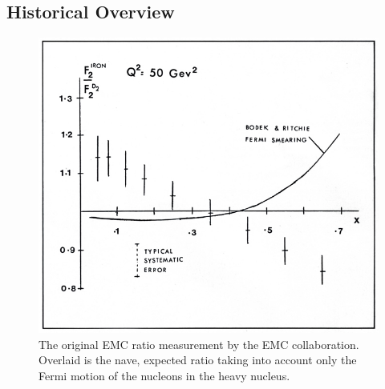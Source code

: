 \subsection{Historical Overview} \label{ssec:emc-history}

\begin{figure}
	\centering
	\includegraphics[height=0.35\textheight]{figures/background/emc_effect_original-v2.jpg}
	\caption{The original EMC ratio measurement by the EMC collaboration\cite{Aubert:1983xm}. Overlaid is the nave, expected ratio taking into account only the Fermi motion of the nucleons in the heavy nucleus.}
	\label{fig:emc-one-naive}
\end{figure}

